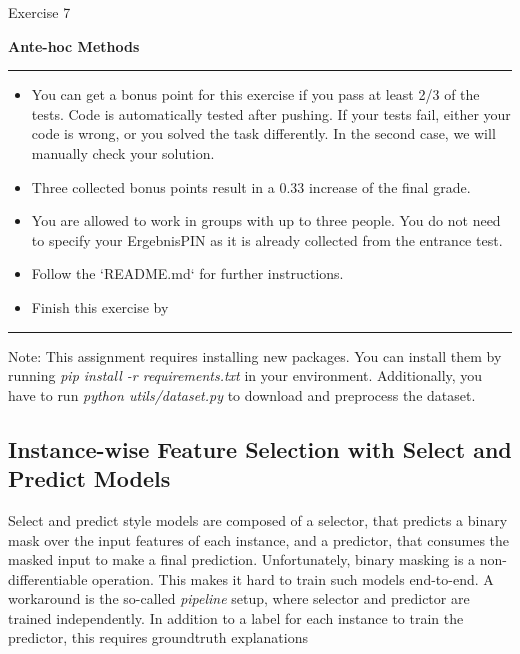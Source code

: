 \documentclass[a4paper]{article}
\begin{document}
{\noindent\LARGE Exercise 7\par}
\vspace{8pt}
{\noindent\huge\textbf{Ante-hoc Methods}}
\vspace{20pt}

\par\noindent\rule{\textwidth}{0.2pt}
\begin{itemize}
    \item You can get a bonus point for this exercise if you pass at least 2/3 of the tests. Code is automatically tested after pushing. If your tests fail, either your code is wrong, or you solved the task differently. In the second case, we will manually check your solution.
    \item Three collected bonus points result in a 0.33 increase of the final grade.
    \item You are allowed to work in groups with up to three people. You do not need to specify your ErgebnisPIN as it is already collected from the entrance test.
    \item Follow the `README.md` for further instructions.
    \item Finish this exercise by \color{red}{1st December, 2021 at 11:59 pm.}
\end{itemize}
\par\noindent\rule{\textwidth}{0.2pt}
\vspace{10pt}

\noindent
Note: This assignment requires installing new packages.
You can install them by running \textit{pip install -r requirements.txt} in your environment.
Additionally, you have to run \textit{python utils/dataset.py} to download and preprocess the dataset.

\noindent
\subsection*{Instance-wise Feature Selection with Select and Predict Models}
Select and predict style models are composed of a selector, that predicts a binary mask over the input features of each instance, and a predictor, that consumes the masked input to make a final prediction.
Unfortunately, binary masking is a non-differentiable operation.
This makes it hard to train such models end-to-end.
A workaround is the so-called \textit{pipeline} setup, where selector and predictor are trained independently.
In addition to a label for each instance to train the predictor, this requires groundtruth explanations
\end{document}
